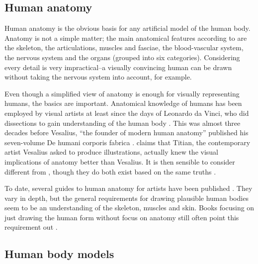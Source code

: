 \subsection{Human anatomy}
Human anatomy is the obvious basis for any artificial model of the human body. Anatomy is not a simple matter; the main anatomical features according to  \citep{pick1977gray} are the skeleton, the articulations, muscles and fasciae, the blood-vascular system, the nervous system and the organs (grouped into six categories). Considering every detail is very impractical--a visually convincing human can be drawn without taking the nervous system into account, for example.

Even though a simplified view of anatomy is enough for visually representing humans, the basics are important. Anatomical knowledge of humans has been employed by visual artists at least since the days of Leonardo da Vinci, who did dissections to gain understanding of the human body . This was almost three decades before Vesalius, ``the founder of modern human anatomy'' published his seven-volume De humani corporis fabrica \citep{vesalius1543}. \citet{hogarth2003} claims that Titian, the contemporary artist Vesalius asked to produce illustrations, actually knew the visual implications of anatomy better than Vesalius. It is then sensible to consider  different from , though they do both exist based on the same truths \citep{hogarth2003}.

To date, several guides to human anatomy for artists have been published \autocites{hogarth2003}{simblet2001}{goldfinger1991}. They vary in depth, but the general requirements for drawing plausible human bodies seem to be an understanding of the skeleton, muscles and skin. Books focusing on just drawing the human form without focus on anatomy still often point this requirement out \autocites{ediciones2004}{loomis1943figure}.



\subsection{Human body models}

